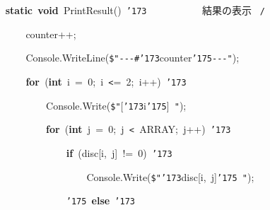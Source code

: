 \documentclass[a4paper,10pt]{article}
\def\mc{\relax}
\begin{document}
\noindent
\mbox{}\hfill

\noindent
\mbox{}{\tt\mc \ }{\tt\mc \ }{\tt\mc \ }{\tt\mc \ }\textbf{static}{\tt\mc \ }\textbf{void}{\tt\mc \ }PrintResult(){\tt\mc \ }{\tt\char'173}{\tt\mc \ }{\tt\mc \ }{\tt\mc \ }{\tt\mc \ }{\tt\mc \ }{\tt\mc \ }{\tt\mc \ }{\tt\mc \ }{\tt\mc \ }\rm\mc {\tt /}{\tt *}\  \ 結果の表示 \hfill \rm\mc \ {\tt *}{\tt /}
\tt\mc 

\noindent
\mbox{}{\tt\mc \ }{\tt\mc \ }{\tt\mc \ }{\tt\mc \ }{\tt\mc \ }{\tt\mc \ }{\tt\mc \ }{\tt\mc \ }counter++;

\noindent
\mbox{}{\tt\mc \ }{\tt\mc \ }{\tt\mc \ }{\tt\mc \ }{\tt\mc \ }{\tt\mc \ }{\tt\mc \ }{\tt\mc \ }Console.WriteLine({\tt\$}{\tt "}{\tt -}{\tt -}{\tt -}{\tt\#}{\tt\char'173}counter{\tt\char'175}{\tt -}{\tt -}{\tt -}{\tt "});

\noindent
\mbox{}{\tt\mc \ }{\tt\mc \ }{\tt\mc \ }{\tt\mc \ }{\tt\mc \ }{\tt\mc \ }{\tt\mc \ }{\tt\mc \ }\textbf{for}{\tt\mc \ }(\textbf{int}{\tt\mc \ }i{\tt\mc \ }={\tt\mc \ }0;{\tt\mc \ }i{\tt\mc \ }{\tt <}={\tt\mc \ }2;{\tt\mc \ }i++){\tt\mc \ }{\tt\char'173}

\noindent
\mbox{}{\tt\mc \ }{\tt\mc \ }{\tt\mc \ }{\tt\mc \ }{\tt\mc \ }{\tt\mc \ }{\tt\mc \ }{\tt\mc \ }{\tt\mc \ }{\tt\mc \ }{\tt\mc \ }{\tt\mc \ }Console.Write({\tt\$}{\tt "}[{\tt\char'173}i{\tt\char'175}]{\tt\mc \ }{\tt "});

\noindent
\mbox{}{\tt\mc \ }{\tt\mc \ }{\tt\mc \ }{\tt\mc \ }{\tt\mc \ }{\tt\mc \ }{\tt\mc \ }{\tt\mc \ }{\tt\mc \ }{\tt\mc \ }{\tt\mc \ }{\tt\mc \ }\textbf{for}{\tt\mc \ }(\textbf{int}{\tt\mc \ }j{\tt\mc \ }={\tt\mc \ }0;{\tt\mc \ }j{\tt\mc \ }{\tt <}{\tt\mc \ }ARRAY;{\tt\mc \ }j++){\tt\mc \ }{\tt\char'173}

\noindent
\mbox{}{\tt\mc \ }{\tt\mc \ }{\tt\mc \ }{\tt\mc \ }{\tt\mc \ }{\tt\mc \ }{\tt\mc \ }{\tt\mc \ }{\tt\mc \ }{\tt\mc \ }{\tt\mc \ }{\tt\mc \ }{\tt\mc \ }{\tt\mc \ }{\tt\mc \ }{\tt\mc \ }\textbf{if}{\tt\mc \ }(disc[i,{\tt\mc \ }j]{\tt\mc \ }!={\tt\mc \ }0){\tt\mc \ }{\tt\char'173}

\noindent
\mbox{}{\tt\mc \ }{\tt\mc \ }{\tt\mc \ }{\tt\mc \ }{\tt\mc \ }{\tt\mc \ }{\tt\mc \ }{\tt\mc \ }{\tt\mc \ }{\tt\mc \ }{\tt\mc \ }{\tt\mc \ }{\tt\mc \ }{\tt\mc \ }{\tt\mc \ }{\tt\mc \ }{\tt\mc \ }{\tt\mc \ }{\tt\mc \ }{\tt\mc \ }Console.Write({\tt\$}{\tt "}{\tt\char'173}disc[i,{\tt\mc \ }j]{\tt\char'175}{\tt\mc \ }{\tt "});

\noindent
\mbox{}{\tt\mc \ }{\tt\mc \ }{\tt\mc \ }{\tt\mc \ }{\tt\mc \ }{\tt\mc \ }{\tt\mc \ }{\tt\mc \ }{\tt\mc \ }{\tt\mc \ }{\tt\mc \ }{\tt\mc \ }{\tt\mc \ }{\tt\mc \ }{\tt\mc \ }{\tt\mc \ }{\tt\char'175}{\tt\mc \ }\textbf{else}{\tt\mc \ }{\tt\char'173}
\end{document}
